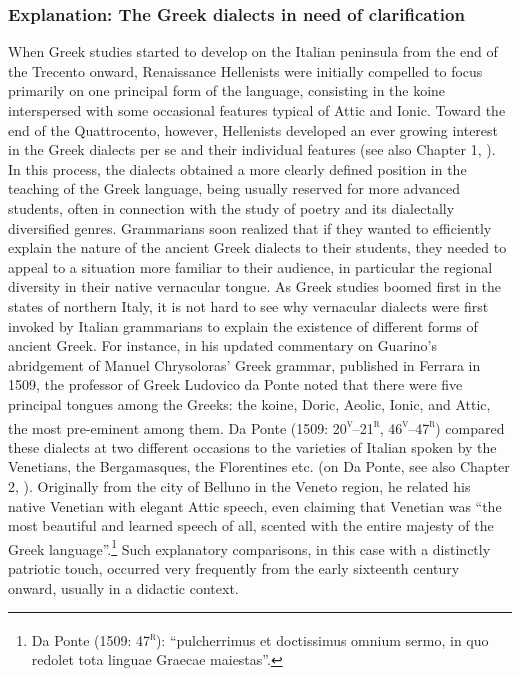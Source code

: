 \documentclass[output=paper]{langsci/langscibook}
\begin{document}
\subsubsection{Explanation: The Greek dialects in need of clarification}
\hypertarget{Toc19704859}{}
When Greek studies started to develop on the Italian peninsula from the end of the Trecento onward, Renaissance Hellenists were initially compelled to focus primarily on one principal form of the language, consisting in the koine interspersed with some occasional features typical of Attic and Ionic. Toward the end of the Quattrocento, however, Hellenists developed an ever growing interest in the Greek dialects per se and their individual features (see also Chapter 1, ). In this process, the dialects obtained a more clearly defined position in the teaching of the Greek language, being usually reserved for more advanced students, often in connection with the study of poetry and its dialectally diversified genres. Grammarians soon realized that if they wanted to efficiently explain the nature of the ancient Greek dialects to their students, they needed to appeal to a situation more familiar to their audience, in particular the regional diversity in their native vernacular tongue. As Greek studies boomed first in the states of northern Italy, it is not hard to see why vernacular dialects were first invoked by Italian grammarians to explain the existence of different forms of ancient Greek. For instance, in his updated commentary on Guarino’s abridgement of Manuel Chrysoloras’ Greek grammar, published in Ferrara in 1509, the professor of Greek Ludovico da Ponte noted that there were five principal tongues among the Greeks: the koine, Doric, Aeolic, Ionic, and Attic, the most pre-eminent among them. Da Ponte (1509: 20\textsc{\textsuperscript{v}}–21\textsc{\textsuperscript{r}}, 46\textsc{\textsuperscript{v}}–47\textsc{\textsuperscript{r}}) compared these dialects at two different occasions to the varieties of Italian spoken by the Venetians, the Bergamasques, the Florentines etc. (on Da Ponte, see also Chapter 2, ). Originally from the city of Belluno in the Veneto region, he related his native Venetian with elegant Attic speech, even claiming that Venetian was “the most beautiful and learned speech of all, scented with the entire majesty of the Greek language”.\footnote{Da Ponte (1509: 47\textsc{\textsuperscript{r}}): “pulcherrimus et doctissimus omnium sermo, in quo redolet tota linguae Graecae maiestas”.} Such explanatory comparisons, in this case with a distinctly patriotic touch, occurred very frequently from the early sixteenth century onward, usually in a didactic context.
\end{document}
